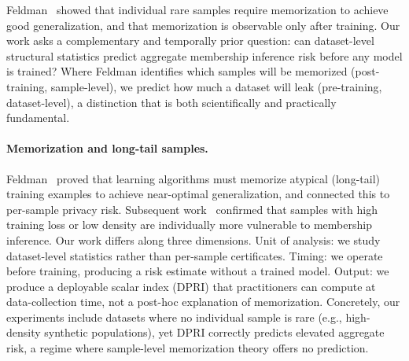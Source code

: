 
%
Feldman~\cite{feldman2020memorization} showed that individual rare
samples require memorization to achieve good generalization, and that
memorization is observable only after training.
Our work asks a complementary and temporally prior question: can
dataset-level structural statistics predict aggregate
membership inference risk before any model is trained?
Where Feldman identifies which samples will be memorized (post-training,
sample-level), we predict how much a dataset will leak (pre-training,
dataset-level), a distinction that is both scientifically and
practically fundamental.


%
\paragraph{Memorization and long-tail samples.}
Feldman~\cite{feldman2020memorization} proved that learning algorithms
must memorize atypical (long-tail) training examples to achieve near-optimal
generalization, and connected this to per-sample privacy risk.
Subsequent work~\cite{carlini2022lira,zhang2021counterfactual} confirmed
that samples with high training loss or low density are individually more
vulnerable to membership inference.
Our work differs along three dimensions.
Unit of analysis: we study dataset-level statistics rather
than per-sample certificates.
Timing: we operate before training, producing a risk estimate
without a trained model.
Output: we produce a deployable scalar index (DPRI) that
practitioners can compute at data-collection time, not a post-hoc
explanation of memorization.
Concretely, our experiments include datasets where no individual
sample is rare (e.g., high-density synthetic populations), yet DPRI
correctly predicts elevated aggregate risk, a regime where sample-level
memorization theory offers no prediction.
